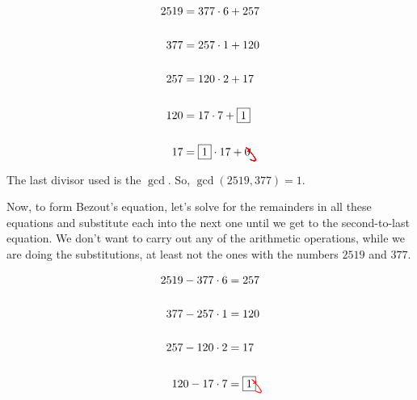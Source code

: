 \documentclass{amsart}
\newcommand{\tikzmark}[1]{\tikz[overlay,remember picture] \node (#1) {};}
\begin{document}
\begin{align*}
2519&=\tikzmark{a}377\cdot6+\tikzmark{c}257\\
&\\
\tikzmark{b}377&=\tikzmark{d}257\cdot1+\tikzmark{f}120\\
&\\
\tikzmark{e}257&=\tikzmark{g}120\cdot2+\tikzmark{h}17\\
&\\
\tikzmark{i}120&=\tikzmark{j}17\cdot7+\tikzmark{k}\boxed{1}\\
&\\
\tikzmark{l}17&=\tikzmark{m}\boxed{1}\cdot 17+0
\begin{tikzpicture}[overlay,remember picture,out=225,out=335,distance=0.6cm]
    \draw[->,red] (a.south) to (b.north);
		\draw[->,red] (c.south) to (d.north);
		\draw[->,red] (d.south) to (e.north);
		\draw[->,red] (f.south) to (g.north);
		\draw[->,red] (g.south) to (i.north);
		\draw[->,red] (h.south) to (j.north);
		\draw[->,red] (j.south) to (l.north);
		\draw[->,red] (k.south) to (m.north);
  \end{tikzpicture}
\end{align*}

The last divisor used is the $\gcd$. So, $\gcd(2519,377)=1$.

Now, to form Bezout's equation, let's solve for the remainders in all these equations and substitute each into the next one until we get to the second-to-last equation. We don't want to carry out any of the arithmetic operations, while we are doing the substitutions, at least not the ones with the numbers $2519$ and $377$.

\begin{align*}
2519-\tikzmark{a}377\cdot6&=\tikzmark{c}257\\
&\\
\tikzmark{b}377-\tikzmark{d}257\cdot1&=\tikzmark{f}120\\
&\\
\tikzmark{e}257-\tikzmark{g}120\cdot2&=\tikzmark{h}17\\
&\\
\tikzmark{i}120-\tikzmark{j}17\cdot7&=\tikzmark{k}\boxed{1}
\begin{tikzpicture}[overlay,remember picture,out=225,out=335,distance=0.6cm]
    \draw[->,red] (c.south) to (d.north);
		\draw[->,red] (f.south) to (g.north);
		\draw[->,red] (h.south) to (j.north);
  \end{tikzpicture}
\end{align*}
\end{document}

